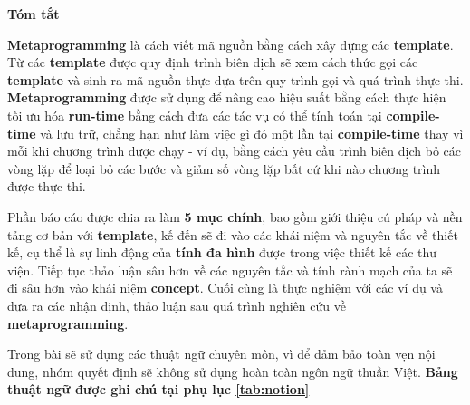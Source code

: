 \begin{Abstract}
\begin{center}

\Large
\vspace{0.9cm}
\textbf{Tóm tắt}
\vspace{0.9cm}
\end{center}
\textbf{Metaprogramming} là cách viết mã nguồn bằng cách xây dựng các \textbf{template}. Từ các \textbf{template} được quy định trình biên dịch sẽ xem cách thức gọi các \textbf{template} và sinh ra mã nguồn thực dựa trên quy trình gọi và quá trình thực thi. \textbf{Metaprogramming} được sử dụng để nâng cao hiệu suất bằng cách thực hiện tối ưu hóa \textbf{run-time} bằng cách đưa các tác vụ có thể tính toán tại \textbf{compile-time} và lưu trữ, chẳng hạn như làm việc gì đó một lần tại \textbf{compile-time} thay vì mỗi khi chương trình được chạy - ví dụ, bằng cách yêu cầu trình biên dịch bỏ các vòng lặp để loại bỏ các bước và giảm số vòng lặp bất cứ khi nào chương trình được thực thi.

\vspace{0.2cm}

Phần báo cáo được chia ra làm \textbf{5 mục chính}, bao gồm giới thiệu cú pháp và nền tảng cơ bản với \textbf{template}, kế đến sẽ đi vào các khái niệm và nguyên tắc về thiết kế, cụ thể là sự linh động của \textbf{tính đa hình} được trong việc thiết kế các thư viện. Tiếp tục thảo luận sâu hơn về các nguyên tắc và tính rành mạch của ta sẽ đi sâu hơn vào khái niệm \textbf{concept}. Cuối cùng là thực nghiệm với các ví dụ và đưa ra các nhận định, thảo luận sau quá trình nghiên cứu về \textbf{metaprogramming}.

\vspace{0.2cm}

Trong bài sẽ sử dụng các thuật ngữ chuyên môn, vì để đảm bảo toàn vẹn nội dung, nhóm quyết định sẽ không sử dụng hoàn toàn ngôn ngữ thuần Việt.\textbf{ Bảng thuật ngữ được ghi chú tại phụ lục \ref{tab:notion}}

\end{Abstract}
